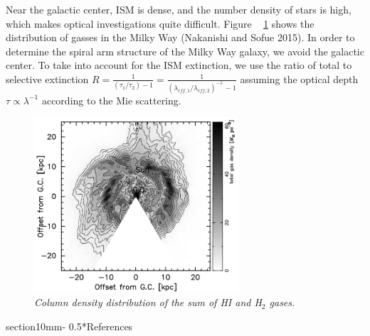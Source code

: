 \documentclass[letterpaper,11pt]{article}
\makeatletter
\renewcommand{\section}{\@startsection%
{section}{1}{0mm}{-\baselineskip}%
{0.5\baselineskip}{\normalfont\Large\bfseries}}%
\makeatother
\begin{document}
Near the galactic center, ISM is dense, and the number density of stars is high, which makes optical investigations quite difficult. Figure ~ \ref{fig:gas} shows the distribution of gasses in the Milky Way (Nakanishi and Sofue 2015). In order to determine the spiral arm structure of the Milky Way galaxy, we avoid the galactic center. To take into account for the ISM extinction, we use the ratio of total to selective extinction $R = \frac{1}{(\tau_{1} / \tau_{2}) -1} = \frac{1}{(\lambda_{eff,1} / \lambda_{eff,2})^{-1} \, -1}$ assuming the optical depth $\tau \propto \lambda^{-1}$ according to the Mie scattering. 

\begin{figure}[htb!]
  \begin{center}
\centerline{\includegraphics[width=3in]{figures/Gas.png}}
\caption{\it \small{Column density distribution of the sum of HI and H$_2$ gases. \label{fig:gas}}}
  \end{center}
\end{figure}



\section*{References}

\noindent{}

\noindent{}

\noindent{}
\end{document}
